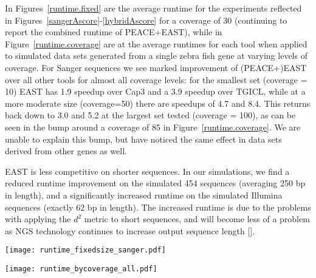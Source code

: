\documentclass{bioinfo}
\newcommand{\peace} {{\small PEACE}}
\newcommand{\capthree} {{\small Cap3}}
\newcommand{\tgicl} {{\small TGICL}}
\newcommand{\east} {{\small EAST}}
\newcommand{\velvet}{{\small Velvet}}
\begin{document}
 In Figures~\ref{runtime.fixed} are
the average runtime for the experiments reflected in
Figures~\ref{sangerAscore}-\ref{hybridAscore} for a coverage of 30
(continuing to report the combined runtime of \peace+\east), while in
Figure~\ref{runtime.coverage} are at the average runtimes for each
tool when applied to simulated data sets generated from a single zebra
fish gene at varying levels of coverage.  For Sanger sequences we
see marked improvement of (\peace+)\east\/ over all other tools for
almost all coverage levels: for the smallest set (coverage = 10)
\east\/ has 1.9 speedup over \capthree\/ and a 3.9 speedup over
\tgicl, while at a more moderate size (coverage=50) there are speedups of
4.7 and 8.4.  This returns back down to 3.0 and 5.2 at the largest set
tested (coverage = 100), as can be seen in the bump around a coverage
of 85 in Figure~\ref{runtime.coverage}.  We are unable to
explain this bump, but have noticed the same effect in
data sets derived from other genes as well.


\east\/ is less competitive on shorter sequences.  In our simulations,
we find a reduced runtime improvement on the simulated 454 sequences
(averaging 250 bp in length), and a significantly increased runtime on
the simulated Illumina sequences (exactly 62 bp in length).  The
increased runtime is due to the problems with applying the $d^2$
metric to short sequences, and will become less of a problem as NGS
technology continues to increase output sequence length
[\cite{Eid09,Li10}]. 



\begin{figure*}[htb]
\centerline{\texttt{[image: runtime\_fixedsize\_sanger.pdf]}}
\caption{Average runtime per trial when generating data for
  Figures~\ref{sangerAscore}-\ref{hybridAscore}  when coverage = 30.
  Note that the exceptionally high speed of \velvet\/ on Illumina sequences make the
  red (center) bars in that plot essentially indistinguishable.}
\label{runtime.fixed}
\end{figure*}

\begin{figure*}[htb]
\centerline{\texttt{[image: runtime\_bycoverage\_all.pdf]}}
\caption{The average runtime when applying each tool to a simulated
  data set derived from a specific zebrafish transcript of length
  14,625 bp.  As we decrease coverage the number of fragments drops,
  hence illustrating the relationship between tool runtime and
  fragment set size.  Each data point represents the average runtime
  from the application of the tool to at least 30 randomly generated
  simulated sets coming from the transcript at the given level of
  coverage.}
\label{runtime.coverage}
\end{figure*}
\end{document}
